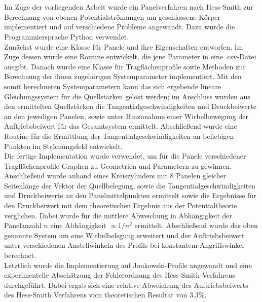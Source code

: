 \chapter*{\abstractname} %
Im Zuge der vorliegenden Arbeit wurde ein Panelverfahren nach Hess-Smith zur Berechnung von ebenen Potentialströmungen um geschlossene Körper implementiert und auf verschiedene Probleme angewandt. Dazu wurde die Programmiersprache Python verwendet.
\\
Zunächst wurde eine Klasse für Panele und ihre Eigenschaften entworfen. Im Zuge dessen wurde eine Routine entwickelt, die jene Parameter in eine .csv-Datei ausgibt. Danach wurde eine Klasse für Tragflächenprofile sowie Methoden zur Berechnung der ihnen zugehörigen Systemparameter implementiert. Mit den somit berechneten Systemparametern kann das sich ergebende lineare Gleichungssystem für die Quellstärken gelöst werden; im Anschluss wurden aus den ermittelten Quellstärken die Tangentialgeschwindigkeiten und Druckbeiwerte an den jeweiligen Panelen, sowie unter Hinzunahme einer Wirbelbewegung der Auftriebsbeiwert für das Gesamtsystem ermittelt. Abschließend wurde eine Routine für die Ermittlung der Tangentialgeschwindigkeiten an beliebigen Punkten im Strömungsfeld entwickelt.
\\
Die fertige Implementation wurde verwendet, um für die Panele verschiedener Tragflächenprofile Graphen zu Geometrien und Parametern zu gewinnen. Anschließend wurde anhand eines Kreiszylinders mit 8 Panelen gleicher Seitenlänge der Vektor der Quellbelegung, sowie die Tangentialgeschwindigkeiten und Druckbeiwerte an den Panelmittelpunkten ermittelt sowie die Ergebnisse für den Druckbeiwert mit dem theoretischen Ergebnis aus der Potentialtheorie verglichen. Dabei wurde für die mittlere Abweichung in Abhängigkeit der Panelanzahl $n$ eine Abhängigkeit $\propto 1 / n^2$ ermittelt. Abschließend wurde das oben genannte System um eine Wirbelbelegung erweitert und der Auftriebsbeiwert unter verschiedenen Anstellwinkeln des Profils bei konstantem Angriffswinkel berechnet. 
\\
Letztlich wurde die Implementierung auf Joukowski-Profile angewandt und eine experimentelle Abschätzung der Fehlerordnung des Hess-Smith-Verfahrens durchgeführt. Dabei ergab sich eine relative Abweichung des Auftriebsbeiwerts des Hess-Smith Verfahrens vom theoretischen Resultat von $3.3 \%$.

\newpage
